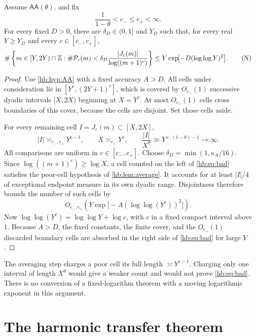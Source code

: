 \begin{proposition}\label{hb:prop:bad}
Assume $\mathsf{AA}(\theta)$, and fix
\[
 \frac1{1-\theta}<c_-\le c_+<\infty.
\]
For every fixed $D>0$, there are $\delta_D\in(0,1]$ and $Y_D$
such that, for every real $Y\ge Y_D$ and every $c\in[c_-,c_+]$,
\[
 \#\left\{m\in[Y,2Y)\cap\mathbb Z:
   \#\mathcal P_c(m)<
       \delta_D\frac{|J_c(m)|}{\log((m+1)^c)}
       \right\}
 \le Y\exp\!\bigl[-D(\log\log Y)^2\bigr].
 \tag{N}\label{hb:eq:bad}
\]
\end{proposition}

\begin{proof}
Use \cref{hb:hyp:AA} with a fixed accuracy $A>D$.
All cells under consideration lie in
$[Y^c,(2Y+1)^c]$, which is covered by $O_{c_+}(1)$ successive
dyadic intervals $[X,2X)$ beginning at $X=Y^c$.
At most $O_{c_+}(1)$ cells cross boundaries of this cover, because
the cells are disjoint.  Set those cells aside.

For every remaining cell $I=J_c(m)\subset[X,2X]$,
\[
 |I|\asymp_{c_-,c_+}Y^{c-1},\qquad X\asymp_{c_+}Y^c,
 \qquad
 \frac{|I|}{X^\theta}\gg
 Y^{\,c_-(1-\theta)-1}\longrightarrow\infty.
\]
All comparisons are uniform in $c\in[c_-,c_+]$.
Choose $\delta_D=\min(1,\kappa_A/16)$.
Since $\log((m+1)^c)\ge\log X$, a cell counted on the left of
\eqref{hb:eq:bad} satisfies the poor-cell hypothesis of
\cref{hb:lem:average}.  It accounts for at least $|I|/4$
of exceptional endpoint measure in its own dyadic range.
Disjointness therefore bounds the number of such cells by
\[
 O_{c_-,c_+}\!\left(
 Y\exp\!\bigl[-A(\log\log(Y^c))^2\bigr]\right).
\]
Now $\log\log(Y^c)=\log\log Y+\log c$, with $c$ in a fixed
compact interval above $1$.  Because $A>D$, the fixed constants,
the finite cover, and the $O_{c_+}(1)$ discarded boundary cells
are absorbed in the right side of \eqref{hb:eq:bad} for large $Y$.
\end{proof}

\begin{remark}\label{hb:rem:fullcell}
The averaging step charges a poor cell its full length
$\asymp Y^{c-1}$.  Charging only one interval of length $X^\theta$
would give a weaker count and would not prove \eqref{hb:eq:bad}.
There is no conversion of a fixed-logarithm theorem with a moving
logarithmic exponent in this argument.
\end{remark}

\section{The harmonic transfer theorem}\label{hb:sec:transfer}

